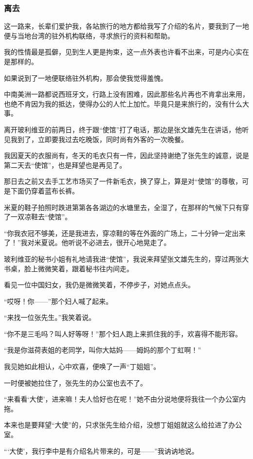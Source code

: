 \subsubsection*{离去}
\par 这一路来，长辈们爱护我，各站旅行的地方都给我写了介绍的名片，要我到了一地便与当地台湾的驻外机构联络，寻求旅行的资料和帮助。
\par 我的性情最是孤僻，见到生人更是拘束，这一点外表也许看不出来，可是内心实在是那样的。
\par 如果说到了一地便联络驻外机构，那会使我觉得羞愧。
\par 中南美洲一路都说西班牙文，行路上没有困难，因此那些名片再也不肯拿出来用，也绝不肯因为我的抵达，使得办公的人忙上加忙。毕竟只是来旅行的，没有什么大事。
\par 离开玻利维亚的前两日，终于跟“使馆”打了电话，那边是张文雄先生在讲话，他听见我到了，立即要我过去吃晚饭，同时尚有外客的一次晚餐。
\par 我因夏天的衣服尚有，冬天的毛衣只有一件，因此坚持谢绝了张先生的诚意，说是第二天去“使馆”，也是拜望也是再见了。
\par 那日去之前又去手工艺市场买了一件新毛衣，换了穿上，算是对“使馆”的尊敬，可是下面仍穿着蓝布长裤。
\par 米夏的鞋子拍照时跌进第第各各湖边的水塘里去，全湿了，在那样的气候下只有穿了一双凉鞋去“使馆”。
\par “你我衣冠不够美，还是我进去，穿凉鞋的等在外面的广场上，二十分钟一定出来了！”我对米夏说。他听说不必进去，很开心地晃走了。
\par 玻利维亚的秘书小姐有礼地请我进“使馆”，我说来拜望张文雄先生的，穿过两张大书桌，脸上微微笑着，跟着秘书往内间走。
\par 看见一位中国妇女，我仍是微微笑着，不停步子，对她点点头。
\par “哎呀！你——”那个妇人喊了起来。
\par “来找一位张先生。”我笑着说。
\par “你不是三毛吗？叫人好等呀！”那个妇人跑上来抓住我的手，欢喜得不能形容。
\par “我是你滋荷表姐的老同学，叫你大姑妈——姆妈的那个丁虹啊！”
\par 我见她如此相认，心中欢喜，便唤了一声“丁姐姐”。
\par 一时便被她拉住了，张先生的办公室也去不了。
\par “来看看‘大使’，进来嘛！夫人恰好也在呢！”她不由分说地便将我往一个办公室内拖。
\par 本来也是要拜望“大使”的，只求张先生给介绍，没想丁姐姐就这么给拉进了办公室。
\par “‘大使’，我行李中是有介绍名片带来的，可是——”我讷讷地说。
